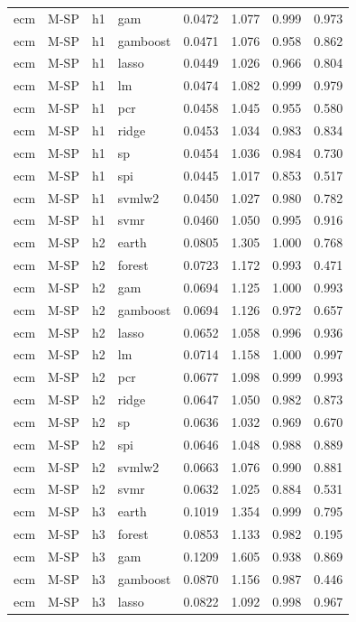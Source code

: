 \begin{ThreePartTable}
\begin{longtable}[t]{llclcccc}
ecm & M-SP & h1 & gam & 0.0472 & 1.077 & 0.999 & 0.973\\
ecm & M-SP & h1 & gamboost & 0.0471 & 1.076 & 0.958 & 0.862\\
ecm & M-SP & h1 & lasso & 0.0449 & 1.026 & 0.966 & 0.804\\
ecm & M-SP & h1 & lm & 0.0474 & 1.082 & 0.999 & 0.979\\
ecm & M-SP & h1 & pcr & 0.0458 & 1.045 & 0.955 & 0.580\\
ecm & M-SP & h1 & ridge & 0.0453 & 1.034 & 0.983 & 0.834\\
ecm & M-SP & h1 & sp & 0.0454 & 1.036 & 0.984 & 0.730\\
ecm & M-SP & h1 & spi & 0.0445 & 1.017 & 0.853 & 0.517\\
ecm & M-SP & h1 & svmlw2 & 0.0450 & 1.027 & 0.980 & 0.782\\
ecm & M-SP & h1 & svmr & 0.0460 & 1.050 & 0.995 & 0.916\\
\addlinespace
ecm & M-SP & h2 & earth & 0.0805 & 1.305 & 1.000 & 0.768\\
ecm & M-SP & h2 & forest & 0.0723 & 1.172 & 0.993 & 0.471\\
ecm & M-SP & h2 & gam & 0.0694 & 1.125 & 1.000 & 0.993\\
ecm & M-SP & h2 & gamboost & 0.0694 & 1.126 & 0.972 & 0.657\\
ecm & M-SP & h2 & lasso & 0.0652 & 1.058 & 0.996 & 0.936\\
ecm & M-SP & h2 & lm & 0.0714 & 1.158 & 1.000 & 0.997\\
ecm & M-SP & h2 & pcr & 0.0677 & 1.098 & 0.999 & 0.993\\
ecm & M-SP & h2 & ridge & 0.0647 & 1.050 & 0.982 & 0.873\\
ecm & M-SP & h2 & sp & 0.0636 & 1.032 & 0.969 & 0.670\\
ecm & M-SP & h2 & spi & 0.0646 & 1.048 & 0.988 & 0.889\\
ecm & M-SP & h2 & svmlw2 & 0.0663 & 1.076 & 0.990 & 0.881\\
ecm & M-SP & h2 & svmr & 0.0632 & 1.025 & 0.884 & 0.531\\
\addlinespace
ecm & M-SP & h3 & earth & 0.1019 & 1.354 & 0.999 & 0.795\\
ecm & M-SP & h3 & forest & 0.0853 & 1.133 & 0.982 & 0.195\\
ecm & M-SP & h3 & gam & 0.1209 & 1.605 & 0.938 & 0.869\\
ecm & M-SP & h3 & gamboost & 0.0870 & 1.156 & 0.987 & 0.446\\
ecm & M-SP & h3 & lasso & 0.0822 & 1.092 & 0.998 & 0.967\\

\end{longtable}
\end{ThreePartTable}
